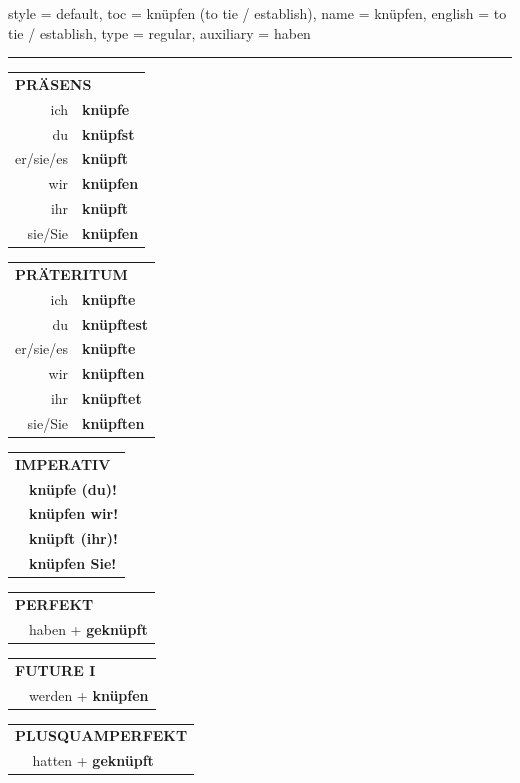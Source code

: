 \begin{verbentry}{
  style = {default},
  toc = {knüpfen (to tie / establish)},
  name = {knüpfen},
  english = {to tie / establish},
  type = {regular},
  auxiliary = {haben}
}
 

\vspace{5pt}
\hrule
\vspace{5pt}

\begin{tabular}{rl}
\multicolumn{2}{l}{\textbf{PRÄSENS}}\\
ich & \textbf{knüpfe}\\
du & \textbf{knüpfst}\\
er/sie/es & \textbf{knüpft}\\
wir & \textbf{knüpfen}\\
ihr & \textbf{knüpft}\\
sie/Sie & \textbf{knüpfen}\\
\end{tabular}
\hfill
\begin{tabular}{rl}
\multicolumn{2}{l}{\textbf{PRÄTERITUM}}\\
ich & \textbf{knüpfte}\\
du & \textbf{knüpftest}\\
er/sie/es & \textbf{knüpfte}\\
wir & \textbf{knüpften}\\
ihr & \textbf{knüpftet}\\
sie/Sie & \textbf{knüpften}\\
\end{tabular}
\hfill
\begin{tabular}{rl}
\multicolumn{2}{l}{\textbf{IMPERATIV}}\\
& \textbf{knüpfe (du)!}\\
& \textbf{knüpfen wir!}\\
& \textbf{knüpft (ihr)!}\\
& \textbf{knüpfen Sie!}\\
\end{tabular}

\vspace{10pt}

\begin{tabular}{rl}
\multicolumn{2}{l}{\textbf{PERFEKT}}\\
& haben + \textbf{geknüpft}\\
\end{tabular}
\hfill
\begin{tabular}{rl}
\multicolumn{2}{l}{\textbf{FUTURE I}}\\
& werden + \textbf{knüpfen}\\
\end{tabular}
\hfill
\begin{tabular}{rl}
\multicolumn{2}{l}{\textbf{PLUSQUAMPERFEKT}}\\
& hatten + \textbf{geknüpft}\\
\end{tabular}


\end{verbentry}
